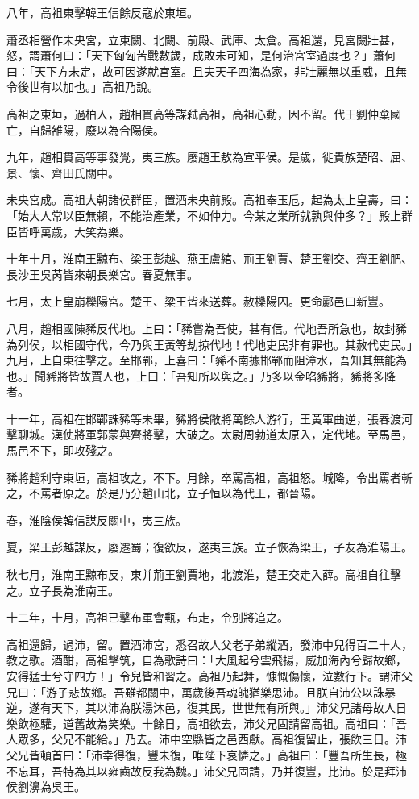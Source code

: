 \begin{pinyinscope}
八年，高祖東擊韓王信餘反寇於東垣。

蕭丞相營作未央宮，立東闕、北闕、前殿、武庫、太倉。高祖還，見宮闕壯甚，怒，謂蕭何曰：「天下匈匈苦戰數歲，成敗未可知，是何治宮室過度也？」蕭何曰：「天下方未定，故可因遂就宮室。且夫天子四海為家，非壯麗無以重威，且無令後世有以加也。」高祖乃說。

高祖之東垣，過柏人，趙相貫高等謀弒高祖，高祖心動，因不留。代王劉仲棄國亡，自歸雒陽，廢以為合陽侯。

九年，趙相貫高等事發覺，夷三族。廢趙王敖為宣平侯。是歲，徙貴族楚昭、屈、景、懷、齊田氏關中。

未央宮成。高祖大朝諸侯群臣，置酒未央前殿。高祖奉玉卮，起為太上皇壽，曰：「始大人常以臣無賴，不能治產業，不如仲力。今某之業所就孰與仲多？」殿上群臣皆呼萬歲，大笑為樂。

十年十月，淮南王黥布、梁王彭越、燕王盧綰、荊王劉賈、楚王劉交、齊王劉肥、長沙王吳芮皆來朝長樂宮。春夏無事。

七月，太上皇崩櫟陽宮。楚王、梁王皆來送葬。赦櫟陽囚。更命酈邑曰新豐。

八月，趙相國陳豨反代地。上曰：「豨嘗為吾使，甚有信。代地吾所急也，故封豨為列侯，以相國守代，今乃與王黃等劫掠代地！代地吏民非有罪也。其赦代吏民。」九月，上自東往擊之。至邯鄲，上喜曰：「豨不南據邯鄲而阻漳水，吾知其無能為也。」聞豨將皆故賈人也，上曰：「吾知所以與之。」乃多以金啗豨將，豨將多降者。

十一年，高祖在邯鄲誅豨等未畢，豨將侯敞將萬餘人游行，王黃軍曲逆，張春渡河擊聊城。漢使將軍郭蒙與齊將擊，大破之。太尉周勃道太原入，定代地。至馬邑，馬邑不下，即攻殘之。

豨將趙利守東垣，高祖攻之，不下。月餘，卒罵高祖，高祖怒。城降，令出罵者斬之，不罵者原之。於是乃分趙山北，立子恒以為代王，都晉陽。

春，淮陰侯韓信謀反關中，夷三族。

夏，梁王彭越謀反，廢遷蜀；復欲反，遂夷三族。立子恢為梁王，子友為淮陽王。

秋七月，淮南王黥布反，東并荊王劉賈地，北渡淮，楚王交走入薛。高祖自往擊之。立子長為淮南王。

十二年，十月，高祖已擊布軍會甀，布走，令別將追之。

高祖還歸，過沛，留。置酒沛宮，悉召故人父老子弟縱酒，發沛中兒得百二十人，教之歌。酒酣，高祖擊筑，自為歌詩曰：「大風起兮雲飛揚，威加海內兮歸故鄉，安得猛士兮守四方！」令兒皆和習之。高祖乃起舞，慷慨傷懷，泣數行下。謂沛父兄曰：「游子悲故鄉。吾雖都關中，萬歲後吾魂魄猶樂思沛。且朕自沛公以誅暴逆，遂有天下，其以沛為朕湯沐邑，復其民，世世無有所與。」沛父兄諸母故人日樂飲極驩，道舊故為笑樂。十餘日，高祖欲去，沛父兄固請留高祖。高祖曰：「吾人眾多，父兄不能給。」乃去。沛中空縣皆之邑西獻。高祖復留止，張飲三日。沛父兄皆頓首曰：「沛幸得復，豐未復，唯陛下哀憐之。」高祖曰：「豐吾所生長，極不忘耳，吾特為其以雍齒故反我為魏。」沛父兄固請，乃并復豐，比沛。於是拜沛侯劉濞為吳王。


\end{pinyinscope}
